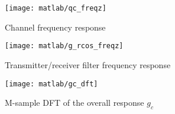 \documentclass[a4paper,oneside]{article}
\begin{document}
\begin{figure}[htbp]
  \centering
  \texttt{[image: matlab/qc\_freqz]}
  \caption{Channel frequency response}
  \label{plot:qc_freqz}
\end{figure}

\begin{figure}[htbp]
  \centering
  \texttt{[image: matlab/g\_rcos\_freqz]}
  \caption{Transmitter/receiver filter frequency response}
  \label{plot:g_rcos_freqz}
\end{figure}

\begin{figure}[htbp]
  \centering
  \texttt{[image: matlab/gc\_dft]}
  \caption{M-sample DFT of the overall response $g_c$}
  \label{plot:gc_dft}
\end{figure}
\end{document}
